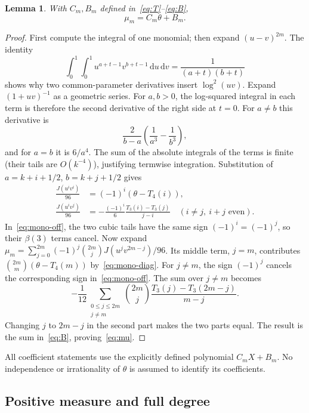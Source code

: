 \documentclass[11pt]{article}
\newtheorem{lemma}[theorem]{Lemma}
\theoremstyle{definition}
\theoremstyle{remark}
\numberwithin{equation}{section}
\newcommand{\dd}{\,\mathrm d}
\begin{document}
\begin{lemma}\label{lem:moment-formula}
With $C_m,B_m$ defined in~\eqref{eq:T}--\eqref{eq:B},
\begin{equation}\label{eq:mu}
 \mu_m=C_m\theta+B_m.
\end{equation}
\end{lemma}

\begin{proof}
First compute the integral of one monomial; then expand $(u-v)^{2m}$.
The identity
\[
 \int_0^1\int_0^1u^{a+t-1}v^{b+t-1}\dd u\dd v
          =\frac1{(a+t)(b+t)}
\]
shows why two common-parameter derivatives insert $\log^2(uv)$.
Expand $(1+uv)^{-1}$ as a geometric series. For $a,b>0$, the
log-squared integral in each term is therefore the second derivative
of the right side at $t=0$. For $a\ne b$ this derivative is
\[
 \frac2{b-a}\left(\frac1{a^3}-\frac1{b^3}\right),
\]
and for $a=b$ it is $6/a^4$. The sum of the absolute integrals of the
terms is finite (their tails are $O(k^{-4})$), justifying termwise
integration. Substitution of $a=k+i+1/2$, $b=k+j+1/2$ gives
\begin{align}
 \frac{J(u^iv^i)}{96}&=(-1)^i(\theta-T_4(i)),\label{eq:mono-diag}\\
 \frac{J(u^iv^j)}{96}&=-\frac{(-1)^i}{6}
                 \frac{T_3(i)-T_3(j)}{j-i}\quad
                 (i\ne j,\ i+j\text{ even}).\label{eq:mono-off}
\end{align}
In~\eqref{eq:mono-off}, the two cubic tails have the same sign
$(-1)^i=(-1)^j$, so their $\beta(3)$ terms cancel.
Now expand
$\mu_m=\sum_{j=0}^{2m}(-1)^j\binom{2m}{j}J(u^jv^{2m-j})/96$.
Its middle term, $j=m$, contributes
$\binom{2m}{m}(\theta-T_4(m))$ by~\eqref{eq:mono-diag}.
For $j\ne m$, the sign $(-1)^j$ cancels the corresponding sign
in~\eqref{eq:mono-off}. The sum over $j\ne m$ becomes
\[
 -\frac1{12}\sum_{\substack{0\leq j\leq2m\\j\ne m}}\binom{2m}{j}
       \frac{T_3(j)-T_3(2m-j)}{m-j}.
\]
Changing $j$ to $2m-j$ in the second part makes the two parts equal.
The result is the sum in~\eqref{eq:B}, proving~\eqref{eq:mu}.
\end{proof}

All coefficient statements use the explicitly defined polynomial
$C_mX+B_m$. No independence or irrationality of $\theta$ is assumed to
identify its coefficients.

\subsection{Positive measure and full degree}
\end{document}
